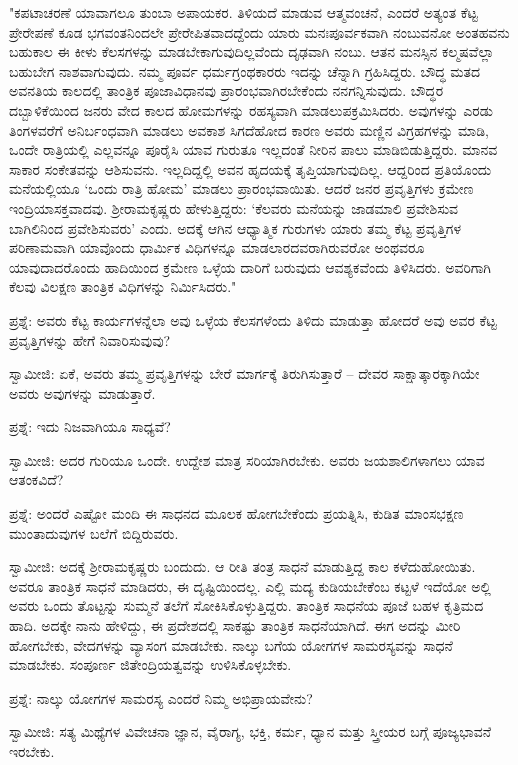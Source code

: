 "ಕಪಟಾಚರಣೆ ಯಾವಾಗಲೂ ತುಂಬಾ ಅಪಾಯಕರ. ತಿಳಿಯದೆ ಮಾಡುವ ಆತ್ಮವಂಚನೆ, ಎಂದರೆ ಅತ್ಯಂತ ಕೆಟ್ಟ ಪ್ರೇರೇಪಣೆ ಕೂಡ ಭಗವಂತನಿಂದಲೇ ಪ್ರೇರೇಪಿತವಾದದ್ದೆಂದು ಯಾರು ಮನಃಪೂರ್ವಕವಾಗಿ ನಂಬುವನೋ ಅಂತಹವನು ಬಹುಕಾಲ ಈ ಕೀಳು ಕೆಲಸಗಳನ್ನು ಮಾಡಬೇಕಾಗುವುದಿಲ್ಲವೆಂದು ದೃಢವಾಗಿ ನಂಬು. ಆತನ ಮನಸ್ಸಿನ ಕಲ್ಮಷವೆಲ್ಲಾ ಬಹುಬೇಗ ನಾಶವಾಗುವುದು. ನಮ್ಮ ಪೂರ್ವ ಧರ್ಮಗ್ರಂಥಕಾರರು ಇದನ್ನು ಚೆನ್ನಾಗಿ ಗ್ರಹಿಸಿದ್ದರು. ಬೌದ್ಧ ಮತದ ಅವನತಿಯ ಕಾಲದಲ್ಲಿ ತಾಂತ್ರಿಕ ಪೂಜಾವಿಧಾನವು ಪ್ರಾರಂಭವಾಗಿರಬೇಕೆಂದು ನನಗನ್ನಿಸುವುದು. ಬೌದ್ಧರ ದಬ್ಬಾಳಿಕೆಯಿಂದ ಜನರು ವೇದ ಕಾಲದ ಹೋಮಗಳನ್ನು ರಹಸ್ಯವಾಗಿ ಮಾಡಲುಪಕ್ರಮಿಸಿದರು. ಅವುಗಳನ್ನು ಎರಡು ತಿಂಗಳವರೆಗೆ ಅನಿರ್ಬಂಧವಾಗಿ ಮಾಡಲು ಅವಕಾಶ ಸಿಗದೆಹೋದ ಕಾರಣ ಅವರು ಮಣ್ಣಿನ ವಿಗ್ರಹಗಳನ್ನು ಮಾಡಿ, ಒಂದೇ ರಾತ್ರಿಯಲ್ಲಿ ಎಲ್ಲವನ್ನೂ ಪೂರೈಸಿ ಯಾವ ಗುರುತೂ ಇಲ್ಲದಂತೆ ನೀರಿನ ಪಾಲು ಮಾಡಿಬಿಡುತ್ತಿದ್ದರು. ಮಾನವ ಸಾಕಾರ ಸಂಕೇತವನ್ನು ಆಶಿಸುವನು. ಇಲ್ಲದಿದ್ದಲ್ಲಿ ಅವನ ಹೃದಯಕ್ಕೆ ತೃಪ್ತಿಯಾಗುವುದಿಲ್ಲ. ಆದ್ದರಿಂದ ಪ್ರತಿಯೊಂದು ಮನೆಯಲ್ಲಿಯೂ ‘ಒಂದು ರಾತ್ರಿ ಹೋಮ’ ಮಾಡಲು ಪ್ರಾರಂಭವಾಯಿತು. ಆದರೆ ಜನರ ಪ್ರವೃತ್ತಿಗಳು ಕ್ರಮೇಣ ಇಂದ್ರಿಯಾಸಕ್ತವಾದವು. ಶ‍್ರೀರಾಮಕೃಷ್ಣರು ಹೇಳುತ್ತಿದ್ದರು: ‘ಕೆಲವರು ಮನೆಯನ್ನು ಜಾಡಮಾಲಿ ಪ್ರವೇಶಿಸುವ ಬಾಗಿಲಿನಿಂದ ಪ್ರವೇಶಿಸುವರು’ ಎಂದು. ಅದಕ್ಕೆ ಆಗಿನ ಆಧ್ಯಾತ್ಮಿಕ ಗುರುಗಳು ಯಾರು ತಮ್ಮ ಕೆಟ್ಟ ಪ್ರವೃತ್ತಿಗಳ ಪರಿಣಾಮವಾಗಿ ಯಾವೊಂದು ಧಾರ್ಮಿಕ ವಿಧಿಗಳನ್ನೂ ಮಾಡಲಾರದವರಾಗಿರುವರೋ ಅಂಥವರೂ ಯಾವುದಾದರೊಂದು ಹಾದಿಯಿಂದ ಕ್ರಮೇಣ ಒಳ್ಳೆಯ ದಾರಿಗೆ ಬರುವುದು ಆವಶ್ಯಕವೆಂದು ತಿಳಿಸಿದರು. ಅವರಿಗಾಗಿ ಕೆಲವು ವಿಲಕ್ಷಣ ತಾಂತ್ರಿಕ ವಿಧಿಗಳನ್ನು ನಿರ್ಮಿಸಿದರು."

ಪ್ರಶ್ನೆ: ಅವರು ಕೆಟ್ಟ ಕಾರ್ಯಗಳನ್ನೆಲಾ ಅವು ಒಳ್ಳೆಯ ಕೆಲಸಗಳೆಂದು ತಿಳಿದು ಮಾಡುತ್ತಾ ಹೋದರೆ ಅವು ಅವರ ಕೆಟ್ಟ ಪ್ರವೃತ್ತಿಗಳನ್ನು ಹೇಗೆ ನಿವಾರಿಸುವುವು?

ಸ್ವಾಮೀಜಿ: ಏಕೆ, ಅವರು ತಮ್ಮ ಪ್ರವೃತ್ತಿಗಳನ್ನು ಬೇರೆ ಮಾರ್ಗಕ್ಕೆ ತಿರುಗಿಸುತ್ತಾರೆ – ದೇವರ ಸಾಕ್ಷಾತ್ಕಾರಕ್ಕಾಗಿಯೇ ಅವರು ಅವುಗಳನ್ನು ಮಾಡುತ್ತಾರೆ.

ಪ್ರಶ್ನೆ: ಇದು ನಿಜವಾಗಿಯೂ ಸಾಧ್ಯವೆ?

ಸ್ವಾಮೀಜಿ: ಅದರ ಗುರಿಯೂ ಒಂದೇ. ಉದ್ದೇಶ ಮಾತ್ರ ಸರಿಯಾಗಿರಬೇಕು. ಅವರು ಜಯಶಾಲಿಗಳಾಗಲು ಯಾವ ಆತಂಕವಿದೆ?

ಪ್ರಶ್ನೆ: ಅಂದರೆ ಎಷ್ಟೋ ಮಂದಿ ಈ ಸಾಧನದ ಮೂಲಕ ಹೋಗಬೇಕೆಂದು ಪ್ರಯತ್ನಿಸಿ, ಕುಡಿತ ಮಾಂಸಭಕ್ಷಣ ಮುಂತಾದುವುಗಳ ಬಲೆಗೆ ಬಿದ್ದಿರುವರು.

ಸ್ವಾಮೀಜಿ: ಅದಕ್ಕೆ ಶ‍್ರೀರಾಮಕೃಷ್ಣರು ಬಂದುದು. ಆ ರೀತಿ ತಂತ್ರ ಸಾಧನೆ ಮಾಡುತ್ತಿದ್ದ ಕಾಲ ಕಳೆದುಹೋಯಿತು. ಅವರೂ ತಾಂತ್ರಿಕ ಸಾಧನೆ ಮಾಡಿದರು, ಈ ದೃಷ್ಟಿಯಿಂದಲ್ಲ. ಎಲ್ಲಿ ಮದ್ಯ ಕುಡಿಯಬೇಕೆಂಬ ಕಟ್ಟಳೆ ಇದೆಯೋ ಅಲ್ಲಿ ಅವರು ಒಂದು ತೊಟ್ಟನ್ನು ಸುಮ್ಮನೆ ತಲೆಗೆ ಸೋಕಿಸಿಕೊಳ್ಳುತ್ತಿದ್ದರು. ತಾಂತ್ರಿಕ ಸಾಧನೆಯ ಪೂಜೆ ಬಹಳ ಕೃತ್ರಿಮದ ಹಾದಿ. ಅದಕ್ಕೇ ನಾನು ಹೇಳಿದ್ದು, ಈ ಪ್ರದೇಶದಲ್ಲಿ ಸಾಕಷ್ಟು ತಾಂತ್ರಿಕ ಸಾಧನೆಯಾಗಿದೆ. ಈಗ ಅದನ್ನು ಮೀರಿ ಹೋಗಬೇಕು, ವೇದಗಳನ್ನು ವ್ಯಾಸಂಗ ಮಾಡಬೇಕು. ನಾಲ್ಕು ಬಗೆಯ ಯೋಗಗಳ ಸಾಮರಸ್ಯವನ್ನು ಸಾಧನೆ ಮಾಡಬೇಕು. ಸಂಪೂರ್ಣ ಜಿತೇಂದ್ರಿಯತ್ವವನ್ನು ಉಳಿಸಿಕೊಳ್ಳಬೇಕು.

ಪ್ರಶ್ನೆ: ನಾಲ್ಕು ಯೋಗಗಳ ಸಾಮರಸ್ಯ ಎಂದರೆ ನಿಮ್ಮ ಅಭಿಪ್ರಾಯವೇನು?

ಸ್ವಾಮೀಜಿ: ಸತ್ಯ ಮಿಥ್ಯೆಗಳ ವಿವೇಚನಾ ಜ್ಞಾನ, ವೈರಾಗ್ಯ, ಭಕ್ತಿ, ಕರ್ಮ, ಧ್ಯಾನ ಮತ್ತು ಸ್ತ್ರೀಯರ ಬಗ್ಗೆ ಪೂಜ್ಯಭಾವನೆ ಇರಬೇಕು.

